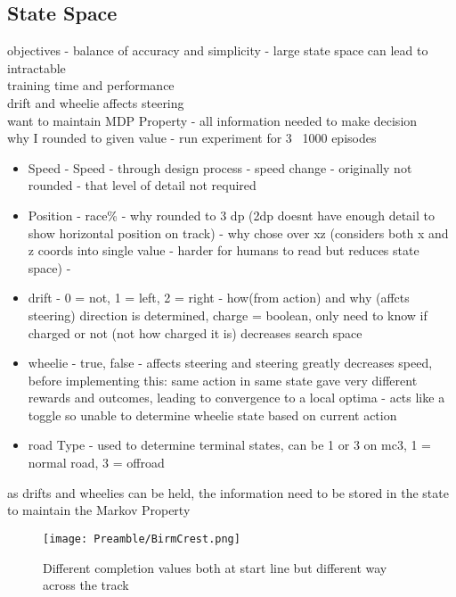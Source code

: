 \subsection{State Space}
objectives - balance of accuracy and simplicity - large state space can lead to intractable 
\\ training time and performance
\\drift and wheelie affects steering
\\want to maintain MDP Property - all information needed to make decision 
\\ why I rounded to given value - run experiment for 3 ~1000 episodes
\begin{itemize}
    \item Speed - Speed - through design process - speed change - originally not rounded - that level of detail not required
    \item Position - race\% - why rounded to 3 dp (2dp doesnt have enough detail to show horizontal position on track) - why chose over xz (considers both x and z coords into single value - harder for humans to read but reduces state space) - 
    \item drift - 0 = not, 1 = left, 2 = right - how(from action) and why (affcts steering) direction is determined, charge = boolean, only need to know if charged or not (not how charged it is) decreases search space
    \item wheelie - true, false - affects steering and steering greatly decreases speed, before implementing this: same action in same state gave very different rewards and outcomes, leading to convergence to a local optima - acts like a toggle so unable to determine wheelie state based on current action
    \item road Type - used to determine terminal states, can be 1 or 3 on mc3, 1 = normal road, 3 = offroad
\end{itemize}
as drifts and wheelies can be held, the information need to be stored in the state to maintain the Markov Property
\begin{figure}[hb]
    \centering
    \texttt{[image: Preamble/BirmCrest.png]}
    \caption{Different completion values both at start line but different way across the track}
    \label{fig:completion-cross-track-difference}
\end{figure}

